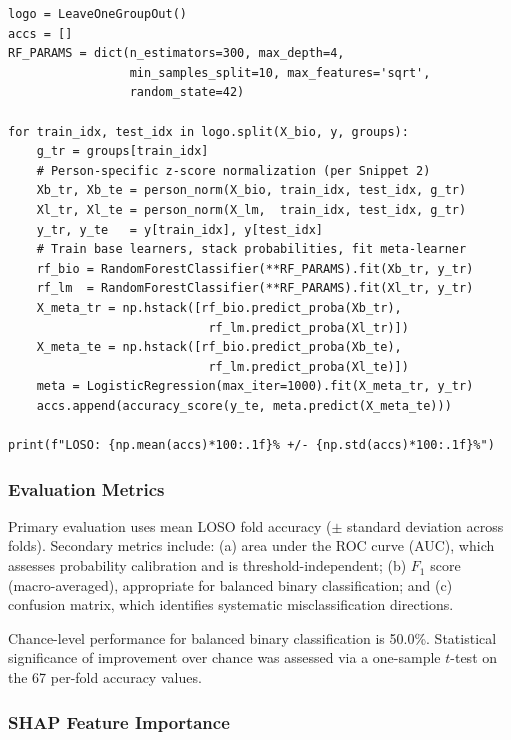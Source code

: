 \documentclass[10pt, twocolumn]{article}
\begin{document}
\begin{lstlisting}[caption={Core LOSO evaluation loop for the stacked fusion model. Arrays \texttt{X\_bio} and \texttt{X\_lm} contain unnormalized features; \texttt{y} contains binary labels; \texttt{groups} contains subject IDs.}, label={lst:loso}]
logo = LeaveOneGroupOut()
accs = []
RF_PARAMS = dict(n_estimators=300, max_depth=4,
                 min_samples_split=10, max_features='sqrt',
                 random_state=42)

for train_idx, test_idx in logo.split(X_bio, y, groups):
    g_tr = groups[train_idx]
    # Person-specific z-score normalization (per Snippet 2)
    Xb_tr, Xb_te = person_norm(X_bio, train_idx, test_idx, g_tr)
    Xl_tr, Xl_te = person_norm(X_lm,  train_idx, test_idx, g_tr)
    y_tr, y_te   = y[train_idx], y[test_idx]
    # Train base learners, stack probabilities, fit meta-learner
    rf_bio = RandomForestClassifier(**RF_PARAMS).fit(Xb_tr, y_tr)
    rf_lm  = RandomForestClassifier(**RF_PARAMS).fit(Xl_tr, y_tr)
    X_meta_tr = np.hstack([rf_bio.predict_proba(Xb_tr),
                            rf_lm.predict_proba(Xl_tr)])
    X_meta_te = np.hstack([rf_bio.predict_proba(Xb_te),
                            rf_lm.predict_proba(Xl_te)])
    meta = LogisticRegression(max_iter=1000).fit(X_meta_tr, y_tr)
    accs.append(accuracy_score(y_te, meta.predict(X_meta_te)))

print(f"LOSO: {np.mean(accs)*100:.1f}% +/- {np.std(accs)*100:.1f}%")
\end{lstlisting}

\subsubsection{Evaluation Metrics}

Primary evaluation uses mean LOSO fold accuracy ($\pm$ standard deviation across folds).
Secondary metrics include: (a) area under the ROC curve (AUC), which assesses probability
calibration and is threshold-independent; (b) $F_1$ score (macro-averaged), appropriate
for balanced binary classification; and (c) confusion matrix, which identifies systematic
misclassification directions.

Chance-level performance for balanced binary classification is 50.0\%. Statistical
significance of improvement over chance was assessed via a one-sample $t$-test on the 67
per-fold accuracy values.

\subsubsection{SHAP Feature Importance}
\end{document}
